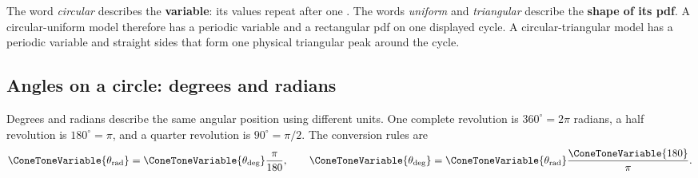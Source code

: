 	The word \emph{circular} describes the \textbf{variable}: its values repeat
	after one .  The words \emph{uniform} and \emph{triangular} describe the
	\textbf{shape of its pdf}.  A circular-uniform model therefore has a periodic
	variable and a rectangular pdf on one displayed cycle.  A
	circular-triangular model has a periodic variable and straight sides that form
	one physical triangular peak around the cycle.
	
	\subsection{Angles on a circle: degrees and radians}%
	\label{sec:c3-intro-angle-reference}
	Degrees and radians describe the same angular position using different units.
	One complete revolution is $360^\circ=2\pi$ radians, a half revolution is
	$180^\circ=\pi$, and a quarter revolution is $90^\circ=\pi/2$.  The
	conversion rules are
	\[
	\ConeToneVariable{\theta_{\mathrm{rad}}}=\ConeToneVariable{\theta_{\mathrm{deg}}}\frac{\pi}{180},
	\qquad
	\ConeToneVariable{\theta_{\mathrm{deg}}}=\ConeToneVariable{\theta_{\mathrm{rad}}}\frac{\ConeToneVariable{180}}{\pi}.
	\]


